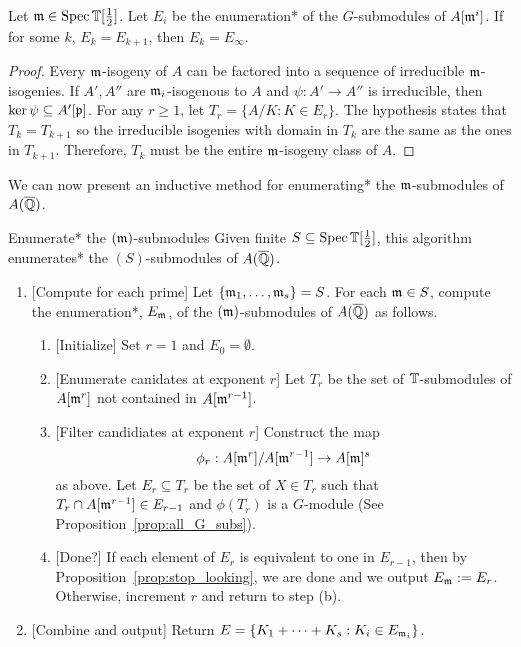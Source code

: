 \documentclass{article}
\begin{document}
\begin{proposition}\label{prop:stop_looking}
    Let $\mathfrak{m}\in \operatorname{Spec} \mathbb{T}[\frac{1}{2}]$. Let $E_i$ be the enumeration* of the
    $G$-submodules of $A[\mathfrak{m}^i]$. If for some $k$, $E_k=E_{k+1}$, then
    $E_k=E_\infty$.
\end{proposition}
\begin{proof}
    Every $\mathfrak{m}$-isogeny of $A$ can be factored into a sequence of irreducible
    $\mathfrak{m}$-isogenies. If $A',A''$ are $\mathfrak{m}_i$-isogenous to $A$ and $\psi:A'\to
    A''$ is irreducible, then $\ker\psi\subseteq A'[\mathfrak{p}]$. For any $r\geq 1$,
    let $T_r=\{A/K:K\in E_r\}$. The hypothesis states that $T_k=T_{k+1}$ so the
    irreducible isogenies with domain in $T_k$ are the same as the ones in
    $T_{k+1}$. Therefore, $T_k$ must be the entire $\mathfrak{m}$-isogeny class of $A$.
\end{proof}

We can now present an inductive method for enumerating* the $\mathfrak{m}$-submodules of
$A(\overline{\mathbb{Q}})$.
\begin{algorithm}{Enumerate* the $(\mathfrak{m})$-submodules}%
    \label{alg:enumerate_m_submodules}
    Given finite $S\subseteq \operatorname{Spec}\mathbb{T}[\frac{1}{2}]$, this algorithm enumerates* the
    $(S)$-submodules of $A(\overline{\mathbb{Q}})$.
    \begin{enumerate}
        \item{} [Compute for each prime]
            Let $\{\mathfrak{m}_1,\ldots,\mathfrak{m}_s\}=S$. For each $\mathfrak{m}\in S$, compute the
            enumeration*, $E_{\mathfrak{m}}$, of the $(\mathfrak{m})$-submodules of $A(\overline{\mathbb{Q}})$ as
            follows.
            \begin{enumerate}
                \item{} [Initialize] 
                    Set $r=1$ and $E_0=\emptyset$.
                \item{} [Enumerate canidates at exponent $r$]
                    Let $T_r$ be the set of $\mathbb{T}$-submodules of $A[\mathfrak{m}^r]$ not
                    contained in $A[\mathfrak{m}^{r-1}]$.
                \item{} [Filter candidiates at exponent $r$]
                    Construct the map 
                    \[
                        \phi_r:A[\mathfrak{m}^r]/A[\mathfrak{m}^{r-1}]\to A[\mathfrak{m}]^s
                    \]
                    as above. Let $E_r\subseteq T_r$ be the set of $X\in T_r$
                    such that $T_r\cap A[\mathfrak{m}^{r-1}]\in E_{r-1}$ and $\phi(T_r)$
                    is a $G$-module (See Proposition~\ref{prop:all_G_subs}).
                \item{} [Done?]
                    If each element of $E_r$ is equivalent to one in $E_{r-1}$,
                    then by Proposition~\ref{prop:stop_looking}, we are done and
                    we output $E_{\mathfrak{m}} := E_r$. Otherwise, increment $r$ and return to
                    step (b).
            \end{enumerate}
        \item{} [Combine and output]
            Return $E = \{K_1+\cdots+K_s:K_i\in E_{\mathfrak{m}_i}\}$.
    \end{enumerate}
\end{algorithm}
\end{document}
